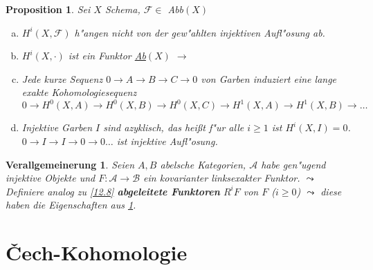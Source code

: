 \documentclass[paper = A4, fontsize=12pt, numbers=noendperiod, chapterprefix=true]{scrbook}
\theoremstyle{break}
\newtheorem{Prop}[Def]{Proposition}
\newtheorem{Verallg}[Def]{Verallgemeinerung}
\theoremstyle{nonumberbreak}
\theoremstyle{nonumberplain}
\newcommand{\emp}[1]{\textbf{\emph{#1}}}
\newcommand{\deftermspec}[2]{{\index{#2}}\emp{#1}}
\DeclareMathOperator{\Kern}{Kern}
\DeclareMathOperator{\Ab}{\underline{Ab}}
\newcommand{\calA}{\mathcal{A}}
\newcommand{\calB}{\mathcal{B}}
\newcommand{\calF}{\mathcal{F}}
\newcommand{\calG}{\mathcal{G}}
\newcommand{\FakRaum}[2]{
	\raisebox{0.7ex}{\ensuremath{#1}}
	\ensuremath{\mkern-3mu}\big/\ensuremath{\mkern-3mu}
	\raisebox{-0.6ex}{\ensuremath{#2}}}
\begin{document}
\begin{Prop}\label{12.9}
Sei $X$ Schema, $\calF \in$ Abb$(X)$
\begin{enumerate}[a)]
\item
	$H^{i}(X, \calF)$ h"angen nicht von der gew"ahlten injektiven Aufl"osung ab.
\item
	$H^{i}(X, \cdot)$ ist ein Funktor \underline{Ab$(X)$} $\to \Ab$
\item
	Jede kurze Sequenz $0 \to A \to B \to C \to 0$ von Garben induziert eine lange exakte Kohomologiesequenz $0 \to H^0(X, A) \to H^0(X, B) \to H^0(X, C) \to H^1(X, A) \to H^1(X, B) \to \ldots$
	\begin{center}\end{center}
\item
	Injektive Garben $I$ sind azyklisch, das hei\ss t f"ur alle $i \ge 1$ ist $H^{i}(X, I) = 0$. $0 \to I \to I \to 0 \to 0 \ldots$ ist injektive Aufl"osung.
\end{enumerate}\end{Prop}

\begin{Verallg}
Seien $A, B$ abelsche Kategorien, $\calA$ habe gen"ugend injektive Objekte und $F: \calA \to \calB$ ein kovarianter linksexakter Funktor. $\leadsto$ Definiere analog zu \ref{12.8} \deftermspec{abgeleitete Funktoren}{Funktor!abgeleiteter} $R^{i}F$ von $F$ ($i \ge 0$) $\leadsto$ diese haben die Eigenschaften aus \ref{12.9}.
\end{Verallg}

\newpage


\section{\v{C}ech-Kohomologie}
\end{document}
